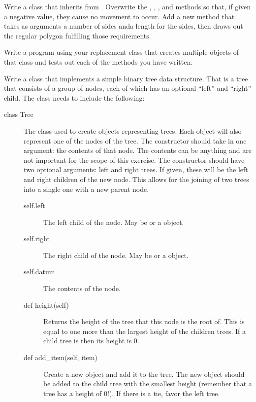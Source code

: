 \documentclass[11pt]{cselabheader}
\begin{document}
\begin{ex}[myturtle.py]
    Write a class that inherits from . Overwrite
    the , , ,
    and  methods so that, if given a negative value, they
    cause no movement to occur. Add a new method 
    that takes as arguments a number of sides anda length for the sides, then
    draws out the regular polygon fulfilling those requirements.

    Write a program using your replacement  class that
    creates multiple objects of that class and tests out each of the methods
    you have written.
\end{ex}

\begin{ex}[tree.py]
    Write a class that implements a simple binary tree data structure. That is a
    tree that consists of a group of nodes, each of which has an optional
    ``left'' and ``right'' child. The class needs to include the following:
    \begin{description}
    \item[class Tree] The class used to create objects representing trees. Each
        object will also represent one of the nodes of the tree. The constructor
        should take in one argument: the contents of that node. The contents can
        be anything and are not important for the scope of this exercise. The
        constructor should have two optional arguments: left and right trees. If
        given, these will be the left and right children of the new node. This
        allows for the joining of two trees into a single one with a new parent
        node.
        \begin{description}
        \item[self.left] The left child of the node. May be
             or a  object.
        \item[self.right] The right child of the node. May be
             or a  object.
        \item[self.datum] The contents of the node.
        \item[def height(self)] Returns the height of the tree that this node
            is the root of. This is equal to one more than the largest height
            of the children trees. If a child tree is  then
            its height is 0.
        \item[def add\_item(self, item)] Create a new  object
            and add it to the tree. The new object should be added to the child
            tree with the smallest height (remember that a 
            tree has a height of 0!). If there is a tie, favor the left tree.
        \end{description}
    \end{description}


\end{ex}
\end{document}
